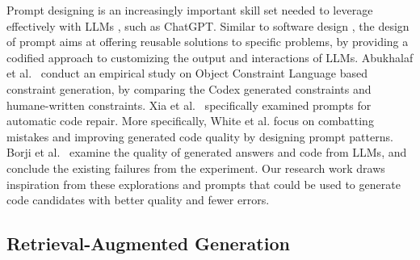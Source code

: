 Prompt designing is an increasingly important skill set needed to leverage effectively with LLMs \cite{white2023prompt}, such as ChatGPT.
Similar to software design \cite{gamma1995design}, the design of prompt aims at offering reusable solutions to specific problems, 
by providing a codified approach to customizing the output and interactions of LLMs.
Abukhalaf et al.~\cite{abukhalaf2023codex} conduct an empirical study on Object Constraint Language based constraint generation, by comparing the Codex generated constraints and humane-written constraints.
Xia et al.~\cite{xia2023conversational} specifically examined prompts for automatic code repair.
More specifically, White et al. \cite{white2023chatgpt} focus on combatting mistakes and improving generated code quality by designing prompt patterns.
Borji et al.~\cite{borji2023categorical} examine the quality of generated answers and code from LLMs, and conclude the existing failures from the experiment. 
Our research work draws inspiration from these explorations and prompts that could be used to generate code candidates with better quality and fewer errors.

\subsection{Retrieval-Augmented Generation}



